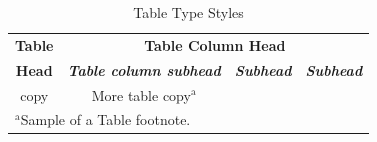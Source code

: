 \documentclass[conference]{IEEEtran}
\begin{document}
\begin{table}[htbp]
    \caption{Table Type Styles}
    \begin{center}
    \begin{tabular}{|c|c|c|c|}
    \hline
    \textbf{Table}&\multicolumn{3}{|c|}{\textbf{Table Column Head}} \\
    \cline{2-4} 
    \textbf{Head} & \textbf{\textit{Table column subhead}}& \textbf{\textit{Subhead}}& \textbf{\textit{Subhead}} \\
    \hline
    copy& More table copy$^{\mathrm{a}}$& &  \\
    \hline
    \multicolumn{4}{l}{$^{\mathrm{a}}$Sample of a Table footnote.}
    \end{tabular}
    \label{tab1}
    \end{center}
    \end{table}
\end{document}
